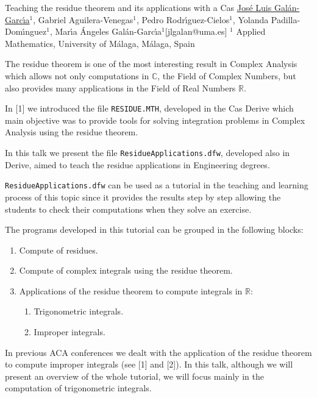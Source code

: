 


\begin{abstract_online}{Teaching the residue theorem and its applications with a {\sc Cas}}{%
        \underline{Jos\'e Luis Gal\'an-Garc\'{\i}a}$^{1}$, Gabriel Aguilera-Venegas$^{1}$, Pedro Rodr\'{\i}guez-Cielos$^{1}$, Yolanda Padilla-Dom\'{\i}nguez$^{1}$, Mar\'{\i}a \'Angeles Gal\'an-Garc\'{\i}a$^{1}$}{[jlgalan@uma.es]
        }{%
        $^1$ Applied Mathematics, University of M\'alaga, M\'alaga, Spain%
}

The residue theorem is one of the most interesting result in Complex Analysis which allows not only computations in $\mathbb{C}$, the Field of Complex Numbers, but also provides many applications in the Field of Real Numbers $\mathbb{R}$.
 
In [1] we introduced the file {\tt RESIDUE.MTH}, developed in the {\sc Cas Derive} which main objective was to provide tools for solving integration problems in Complex Analysis using the residue theorem.

In this talk we present the file {\tt ResidueApplications.dfw}, developed also in {\sc Derive}, aimed to teach the residue applications in Engineering degrees.

{\tt ResidueApplications.dfw} can be used as a tutorial in the teaching and learning process of this topic since it provides the results step by step allowing the students to check their computations when they solve an exercise.

The programs developed in this tutorial can be grouped in the following blocks:
\begin{enumerate}
\item Compute of residues.
\item Compute of complex integrals using the residue theorem.
\item Applications of the residue theorem to compute integrals in $\mathbb{R}$:
\begin{enumerate}
\item Trigonometric integrals.
\item Improper integrals.
\end{enumerate}
\end{enumerate}
In previous ACA conferences we dealt with the application of the residue theorem to compute improper integrals (see [1] and [2]). In this talk, although we will present an overview of the whole tutorial, we will focus mainly in the computation of trigonometric integrals. 



\end{abstract_online}
